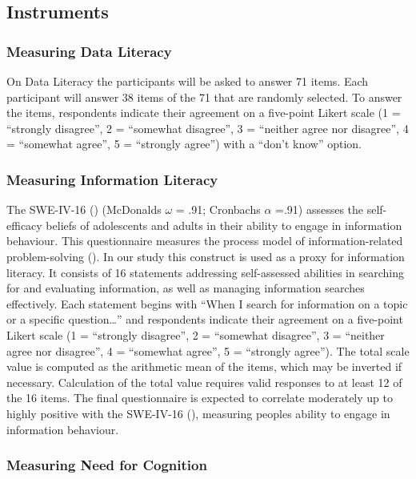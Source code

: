 \documentclass[
  12pt,
  a4paper,
  twoside]{article}
\begin{document}
\subsection{Instruments}\label{instruments}

\subsubsection{Measuring Data Literacy}\label{measuring-data-literacy}

On Data Literacy the participants will be asked to answer 71
items. Each participant will answer 38 items of the 71 that are randomly selected.
To answer the items, respondents indicate their agreement on a five-point Likert
scale (1 = ``strongly disagree'', 2 = ``somewhat disagree'', 3 = ``neither agree nor
disagree'', 4 = ``somewhat agree'', 5 = ``strongly agree'') with a ``don't know''
option.

\subsubsection{Measuring Information Literacy}\label{measuring-information-literacy}

The SWE-IV-16 () (McDonalds \(\omega\) = .91; Cronbachs \(\alpha\) =.91) assesses the self-efficacy beliefs of adolescents and adults in their ability to engage in information behaviour. This
questionnaire measures the process model of information-related problem-solving
(). In our study this construct is used as a proxy for information literacy.
It consists of 16 statements addressing self-assessed
abilities in searching for and evaluating information, as well as managing
information searches effectively. Each statement begins with ``When I search for
information on a topic or a specific question\ldots{}'' and respondents indicate their
agreement on a five-point Likert scale (1 = ``strongly disagree'', 2 = ``somewhat
disagree'', 3 = ``neither agree nor disagree'', 4 = ``somewhat agree'', 5 = ``strongly
agree''). The total scale value is computed as the arithmetic
mean of the items, which may be inverted if necessary. Calculation of the total value
requires valid responses to at least 12 of the 16 items. The final questionnaire is expected to correlate moderately up to highly positive with the SWE-IV-16 (), measuring peoples ability to engage in information behaviour.

\subsubsection{Measuring Need for Cognition}\label{measuring-need-for-cognition}
\end{document}
